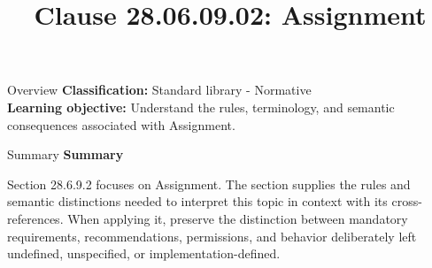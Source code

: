 \documentclass[10pt,letterpaper]{article}
\title{Clause 28.06.09.02: Assignment}
\author{}
\date{}
\begin{document}
\maketitle
\begin{CornellOverviewBox}{Overview}
\textbf{Classification:} Standard library - Normative\\[2pt]
\textbf{Learning objective:} Understand the rules, terminology, and semantic consequences associated with Assignment.
\end{CornellOverviewBox}\begin{CornellSummaryBox}{Summary}
{\sffamily\bfseries\color{Accent} Summary}\par\vspace{3pt}Section 28.6.9.2 focuses on Assignment. The section supplies the rules and semantic distinctions needed to interpret this topic in context with its cross-references. When applying it, preserve the distinction between mandatory requirements, recommendations, permissions, and behavior deliberately left undefined, unspecified, or implementation-defined.
\end{CornellSummaryBox}
\end{document}

